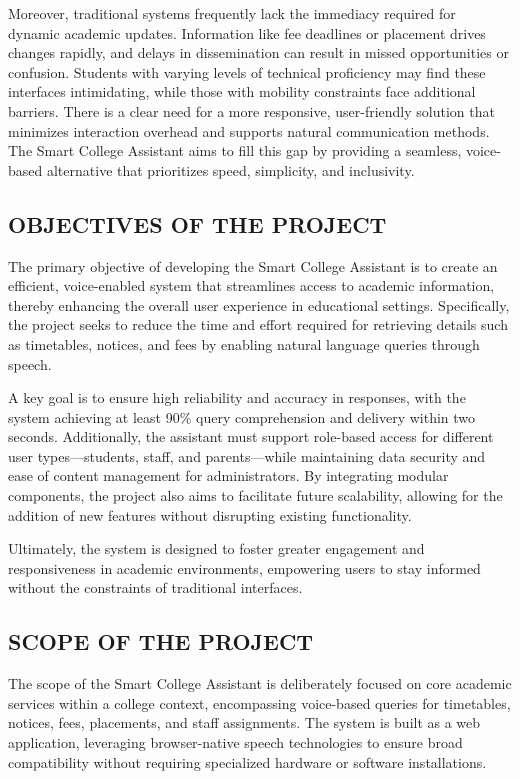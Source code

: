 \documentclass{article}
\begin{document}
Moreover, traditional systems frequently lack the immediacy required for dynamic academic updates. Information like fee deadlines or placement drives changes rapidly, and delays in dissemination can result in missed opportunities or confusion. Students with varying levels of technical proficiency may find these interfaces intimidating, while those with mobility constraints face additional barriers. There is a clear need for a more responsive, user-friendly solution that minimizes interaction overhead and supports natural communication methods. The Smart College Assistant aims to fill this gap by providing a seamless, voice-based alternative that prioritizes speed, simplicity, and inclusivity.

\subsection{OBJECTIVES OF THE PROJECT}
The primary objective of developing the Smart College Assistant is to create an efficient, voice-enabled system that streamlines access to academic information, thereby enhancing the overall user experience in educational settings. Specifically, the project seeks to reduce the time and effort required for retrieving details such as timetables, notices, and fees by enabling natural language queries through speech.

A key goal is to ensure high reliability and accuracy in responses, with the system achieving at least 90\% query comprehension and delivery within two seconds. Additionally, the assistant must support role-based access for different user types—students, staff, and parents—while maintaining data security and ease of content management for administrators. By integrating modular components, the project also aims to facilitate future scalability, allowing for the addition of new features without disrupting existing functionality.

Ultimately, the system is designed to foster greater engagement and responsiveness in academic environments, empowering users to stay informed without the constraints of traditional interfaces.

\subsection{SCOPE OF THE PROJECT}
The scope of the Smart College Assistant is deliberately focused on core academic services within a college context, encompassing voice-based queries for timetables, notices, fees, placements, and staff assignments. The system is built as a web application, leveraging browser-native speech technologies to ensure broad compatibility without requiring specialized hardware or software installations.
\end{document}
